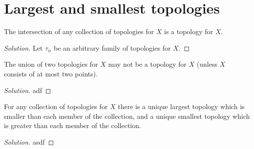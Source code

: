 \section{Largest and smallest topologies}

\begin{problem}
  The intersection of any collection of topologies for $X$ is a topology for
  $X$.
\end{problem}

\begin{proof}[Solution]
  Let $\tau_{\alpha}$ be an arbitrary family of topologies for $X$.
\end{proof}

\begin{problem}
  The union of two topologies for $X$ may not be a topology for $X$ (unless $X$
  consists of at most two points).
\end{problem}

\begin{proof}[Solution]
  adf
\end{proof}

\begin{problem}
  For any collection of topologies for $X$ there is a unique largest topology
  which is smaller than each member of the collection, and a unique smallest
  topology which is greater than each member of the collection.
\end{problem}

\begin{proof}[Solution]
  asdf
\end{proof}
